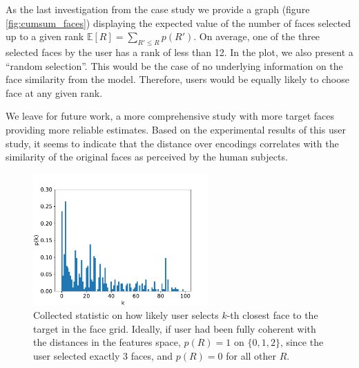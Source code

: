 As the last investigation from the case study we provide a graph (figure \ref{fig:cumsum_faces}) displaying the expected value of the number of faces selected up to a given rank $\mathbb{E}[R] = \sum_{R' \leq R}p(R')$. On average, one of the three selected faces by the user has a rank of less than 12. In the plot, we also present a ``random selection''. This would be the case of no underlying information on the face similarity from the model. Therefore, users would be equally likely to choose face at any given rank.

We leave for future work, a more comprehensive study with more target faces providing more reliable estimates. Based on the experimental results of this user study, it seems to indicate that the distance over encodings correlates with the similarity of the original faces as perceived by the human subjects.

\begin{figure}
    \centering
    \includegraphics[width=0.6\textwidth]{graphs/survey_distribution_without_the_easy.pdf}
    
    \caption{Collected statistic on how likely user selects $k$-th closest face to the target in the face grid. Ideally, if user had been fully coherent with the distances in the features space, $p(R) = 1$ on $\{0,1,2\}$, since the user selected exactly 3 faces, and $p(R) = 0$ for all other $R$.}
    \label{fig:survey_distribution}
\end{figure}


